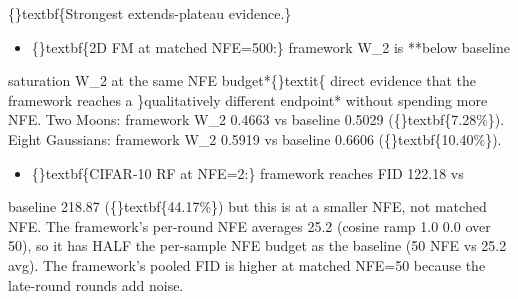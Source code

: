 \documentclass{article}
\begin{document}
\begin{table}[ht]
\centering
\small
{}%
\end{table}

\{\}textbf\{Strongest extends-plateau evidence.\}

\begin{itemize}
\item \{\}textbf\{2D FM at matched NFE=500:\} framework W\_2 is **below baseline
\end{itemize}
saturation W\_2 at the same NFE budget*\{\}textit\{  direct evidence that the framework reaches a \}qualitatively different endpoint* without spending more NFE. Two Moons: framework W\_2 0.4663 vs baseline 0.5029 (\{\}textbf\{7.28\%\}). Eight Gaussians: framework W\_2 0.5919 vs baseline 0.6606 (\{\}textbf\{10.40\%\}).

\begin{itemize}
\item \{\}textbf\{CIFAR-10 RF at NFE=2:\} framework reaches FID 122.18 vs
\end{itemize}
baseline 218.87 (\{\}textbf\{44.17\%\})  but this is at a smaller NFE, not matched NFE. The framework's per-round NFE averages 25.2 (cosine ramp 1.0  0.0 over 50), so it has HALF the per-sample NFE budget as the baseline (50 NFE vs 25.2 avg). The framework's pooled FID is higher at matched NFE=50 because the late-round  rounds add noise.
\end{document}
